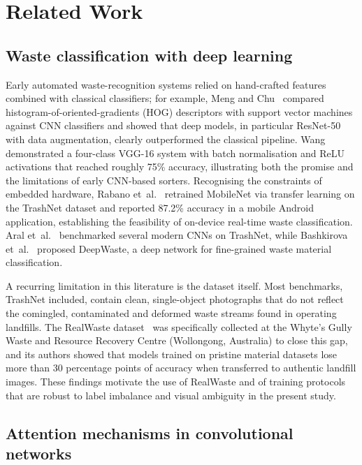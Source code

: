\documentclass[a4paper,fleqn]{cas-dc}
\begin{document}
\section{Related Work}\label{sec:related}

\subsection{Waste classification with deep learning}

Early automated waste-recognition systems relied on hand-crafted features
combined with classical classifiers; for example, Meng and Chu~\cite{meng_a_study}
compared histogram-of-oriented-gradients (HOG) descriptors with support
vector machines against CNN classifiers and showed that deep models, in
particular ResNet-50 with data augmentation, clearly outperformed the
classical pipeline. Wang demonstrated a four-class VGG-16 system with batch
normalisation and ReLU activations that reached roughly 75\% accuracy,
illustrating both the promise and the limitations of early CNN-based
sorters. Recognising the constraints of embedded hardware, Rabano
et~al.~\cite{rabano_common} retrained MobileNet via transfer learning on the
TrashNet dataset and reported 87.2\% accuracy in a mobile Android
application, establishing the feasibility of on-device real-time waste
classification. Aral et~al.~\cite{aral_trashnet} benchmarked several modern
CNNs on TrashNet, while Bashkirova et~al.~\cite{deepwaste} proposed
DeepWaste, a deep network for fine-grained waste material classification.

A recurring limitation in this literature is the dataset itself. Most
benchmarks, TrashNet included, contain clean, single-object photographs that
do not reflect the comingled, contaminated and deformed waste streams found
in operating landfills. The RealWaste dataset~\cite{realwaste} was
specifically collected at the Whyte's Gully Waste and Resource Recovery
Centre (Wollongong, Australia) to close this gap, and its authors showed
that models trained on pristine material datasets lose more than 30
percentage points of accuracy when transferred to authentic landfill images.
These findings motivate the use of RealWaste and of training protocols that
are robust to label imbalance and visual ambiguity in the present study.

\subsection{Attention mechanisms in convolutional networks}
\end{document}
